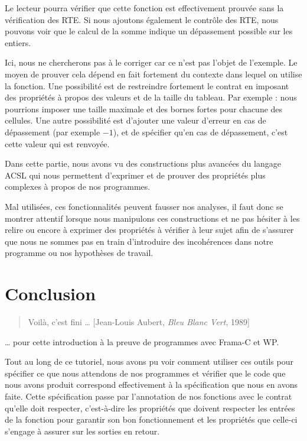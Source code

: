 \documentclass[12pt,francais,]{scrbook}
\begin{document}
Le lecteur pourra vérifier que cette fonction est effectivement prouvée
sans la vérification des RTE. Si nous ajoutons également le contrôle des
RTE, nous pouvons voir que le calcul de la somme indique un dépassement
possible sur les entiers.

Ici, nous ne chercherons pas à le corriger car ce n'est pas l'objet de
l'exemple. Le moyen de prouver cela dépend en fait fortement du contexte
dans lequel on utilise la fonction. Une possibilité est de restreindre
fortement le contrat en imposant des propriétés à propos des valeurs et
de la taille du tableau. Par exemple : nous pourrions imposer une taille
maximale et des bornes fortes pour chacune des cellules. Une autre
possibilité est d'ajouter une valeur d'erreur en cas de dépassement (par
exemple \(-1\)), et de spécifier qu'en cas de dépassement, c'est cette
valeur qui est renvoyée.

Dans cette partie, nous avons vu des constructions plus avancées du
langage ACSL qui nous permettent d'exprimer et de prouver des propriétés
plus complexes à propos de nos programmes.

Mal utilisées, ces fonctionnalités peuvent fausser nos analyses, il faut
donc se montrer attentif lorsque nous manipulons ces constructions et ne
pas hésiter à les relire ou encore à exprimer des propriétés à vérifier
à leur sujet afin de s'assurer que nous ne sommes pas en train
d'introduire des incohérences dans notre programme ou nos hypothèses de
travail.

\chapter{Conclusion}\label{conclusion}

\begin{quote}
Voilà, c'est fini \ldots{} \hfill {[}Jean-Louis Aubert, \emph{Bleu Blanc
Vert}, 1989{]}
\end{quote}

\ldots{} pour cette introduction à la preuve de programmes avec Frama-C
et WP.

Tout au long de ce tutoriel, nous avons pu voir comment utiliser ces
outils pour spécifier ce que nous attendons de nos programmes et
vérifier que le code que nous avons produit correspond effectivement à
la spécification que nous en avons faite. Cette spécification passe par
l'annotation de nos fonctions avec le contrat qu'elle doit respecter,
c'est-à-dire les propriétés que doivent respecter les entrées de la
fonction pour garantir son bon fonctionnement et les propriétés que
celle-ci s'engage à assurer sur les sorties en retour.
\end{document}
